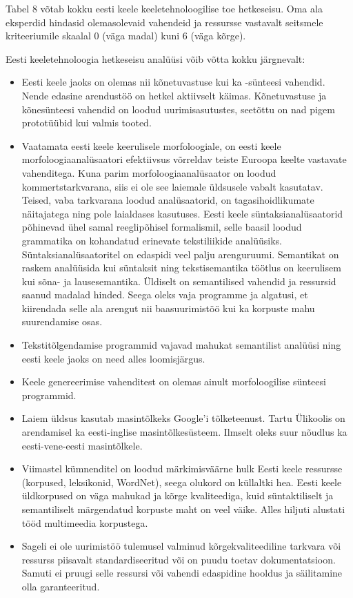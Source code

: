 \begin{multicols}{2}
Tabel 8 võtab kokku eesti keele keeletehnoloogilise toe hetkeseisu.  Oma ala eksperdid hindasid olemasolevaid vahendeid ja ressursse vastavalt seitsmele kriteeriumile skaalal 0 (väga madal) kuni 6 (väga kõrge).

Eesti keeletehnoloogia hetkeseisu analüüsi võib võtta kokku järgnevalt:

\begin{itemize}
  \item Eesti keele jaoks on olemas nii kõnetuvastuse kui ka -sünteesi vahendid. 
Nende edasine arendustöö on hetkel aktiivselt käimas. 
Kõnetuvastuse ja kõnesünteesi vahendid on loodud uurimisasutustes, seetõttu on nad pigem prototüübid kui valmis tooted.
  \item Vaatamata eesti keele keerulisele morfoloogiale, on eesti keele morfoloogiaanalüsaatori efektiivsus võrreldav teiste Euroopa keelte vastavate vahenditega. 
Kuna parim morfoloogiaanalüsaator on loodud kommertstarkvarana, siis ei ole see laiemale üldsusele vabalt kasutatav. 
Teised, vaba tarkvarana loodud analüsaatorid, on tagasihoidlikumate näitajatega ning pole laialdases kasutuses. 
Eesti keele süntaksianalüsaatorid põhinevad ühel samal reeglipõhisel formalismil, selle baasil loodud grammatika on kohandatud erinevate tekstiliikide analüüsiks. 
Süntaksianalüsaatoritel on edaspidi veel palju arenguruumi. 
Semantikat on raskem analüüsida kui süntaksit ning tekstisemantika töötlus on keerulisem kui sõna- ja lausesemantika. 
Üldiselt on semantilised vahendid ja ressursid saanud madalad hinded. 
Seega oleks vaja programme ja algatusi, et kiirendada selle ala arengut nii baasuurimistöö kui ka korpuste mahu suurendamise osas. 
  \item Tekstitõlgendamise programmid vajavad mahukat semantilist analüüsi ning eesti keele jaoks on need alles loomisjärgus.
  \item Keele genereerimise vahenditest on olemas ainult morfoloogilise sünteesi programmid.
  \item Laiem üldsus kasutab masintõlkeks Google'i tõlketeenust. Tartu Ülikoolis on arendamisel ka eesti-inglise masintõlkesüsteem. Ilmselt oleks suur nõudlus ka eesti-vene-eesti masintõlkele.
  \item Viimastel kümnenditel on loodud märkimisväärne hulk Eesti keele ressursse (korpused, leksikonid, WordNet), seega olukord on küllaltki hea. Eesti keele üldkorpused on väga mahukad ja kõrge kvaliteediga, kuid süntaktiliselt ja semantiliselt märgendatud korpuste maht on veel väike. Alles hiljuti alustati tööd multimeedia korpustega. 
  \item Sageli ei ole uurimistöö tulemusel valminud kõrgekvaliteediline tarkvara või ressurss piisavalt standardiseeritud või on puudu toetav dokumentatsioon. Samuti ei pruugi selle ressursi või vahendi edaspidine hooldus ja säilitamine olla garanteeritud. 
\end{itemize}


\end{multicols}
